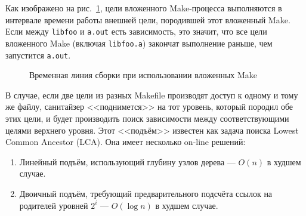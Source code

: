 Как изображено на рис.~\ref{fig:nested-make-timeline}, цели вложенного Make-процесса выполняются в интервале времени работы внешней цели, породившей этот вложенный Make. Если между \texttt{libfoo} и \texttt{a.out} есть зависимость, это значит, что все цели вложенного Make (включая \texttt{libfoo.a}) закончат выполнение раньше, чем запустится \texttt{a.out}.

\begin{figure}[H]
    \centering

    \caption{Временная линия сборки при использовании вложенных Make}
    \label{fig:nested-make-timeline}
\end{figure}

В случае, если две цели из разных Makefile производят доступ к одному и тому же файлу, санитайзер <<поднимется>> на тот уровень, который породил обе этих цели, и будет производить поиск зависимости между соответствующими целями верхнего уровня. Этот <<подъём>> известен как задача поиска Lowest Common Ancestor (LCA). Она имеет несколько on-line решений:

\begin{enumerate}
    \item Линейный подъём, использующий глубину узлов дерева --- $O(n)$ в худшем случае.
    \item Двоичный подъём, требующий предварительного подсчёта ссылок на родителей уровней $2^i$ --- $O(\log{n})$ в худшем случае.
\end{enumerate}

